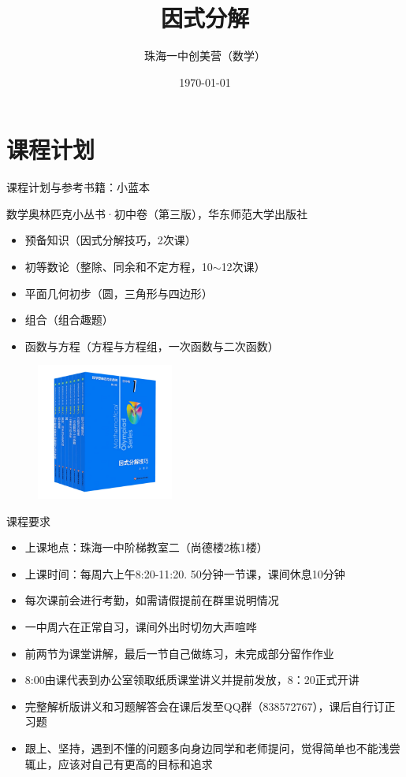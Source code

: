 \documentclass[aspectratio=169]{ctexbeamer}
\title[因式分解]{因式分解}
\subtitle{}
\author[珠海一中创美营]{珠海一中创美营（数学）}
\date[\today]{\today}
\theoremstyle{definition}
\begin{document}
\frame{\titlepage}

\section{课程计划}
\begin{frame}{课程计划与参考书籍：小蓝本}
	\begin{multicols}{2}
		数学奥林匹克小丛书·初中卷（第三版），华东师范大学出版社
		\begin{itemize}
			\item 预备知识（因式分解技巧，2次课）
			\item 初等数论（整除、同余和不定方程，10$\sim$12次课）
			\item 平面几何初步（圆，三角形与四边形）
			\item 组合（组合趣题）
			\item 函数与方程（方程与方程组，一次函数与二次函数）
		\end{itemize}
		\begin{figure}
			\flushright
			\includegraphics[width=0.4\textwidth]{小蓝本.png}
		\end{figure}
	\end{multicols}
\end{frame}

\begin{frame}{课程要求}
	\begin{itemize}
		\item 上课地点：珠海一中阶梯教室二（尚德楼2栋1楼）
		\item 上课时间：每周六上午8:20-11:20. 50分钟一节课，课间休息10分钟
		\item 每次课前会进行考勤，如需请假提前在群里说明情况
		\item 一中周六在正常自习，课间外出时切勿大声喧哗
		\item 前两节为课堂讲解，最后一节自己做练习，未完成部分留作作业
		\item 8:00由课代表到办公室领取纸质课堂讲义并提前发放，8：20正式开讲
		\item 完整解析版讲义和习题解答会在课后发至QQ群（838572767），课后自行订正习题
		\item 跟上、坚持，遇到不懂的问题多向身边同学和老师提问，觉得简单也不能浅尝辄止，应该对自己有更高的目标和追求
	\end{itemize}
\end{frame}
\end{document}
